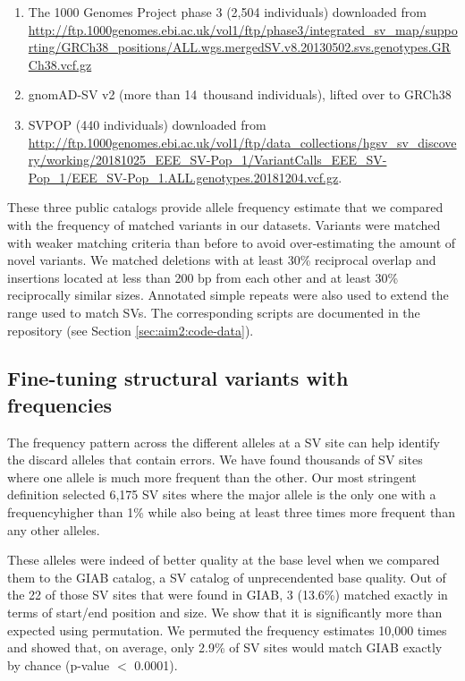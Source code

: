 \documentclass[11pt]{ucscthesis}
\begin{document}
\begin{enumerate}
\item The 1000 Genomes Project phase 3\cite{1000gp_sv_2015} (2,504 individuals) downloaded from \url{http://ftp.1000genomes.ebi.ac.uk/vol1/ftp/phase3/integrated_sv_map/supporting/GRCh38_positions/ALL.wgs.mergedSV.v8.20130502.svs.genotypes.GRCh38.vcf.gz}
\item gnomAD-SV\cite{gnomadsv_2020} v2 (more than 14~thousand individuals), lifted over to GRCh38
\item SVPOP\cite{audano_hgsvc} (440 individuals) downloaded from \url{http://ftp.1000genomes.ebi.ac.uk/vol1/ftp/data_collections/hgsv_sv_discovery/working/20181025_EEE_SV-Pop_1/VariantCalls_EEE_SV-Pop_1/EEE_SV-Pop_1.ALL.genotypes.20181204.vcf.gz}.
\end{enumerate}


These three public catalogs provide allele frequency estimate that we compared with the frequency of matched variants in our datasets.
Variants were matched with weaker matching criteria than before to avoid over-estimating the amount of novel variants.
We matched deletions with at least 30\% reciprocal overlap and insertions located at less than 200 bp from each other and at least 30\% reciprocally similar sizes.
Annotated simple repeats were also used to extend the range used to match SVs.
The corresponding scripts are documented in the repository (see Section \ref{sec:aim2:code-data}).

\subsection{Fine-tuning structural variants with frequencies}
\label{subsec:aim2:svfinetuning}


The frequency pattern across the different alleles at a SV site can help identify the discard alleles that contain errors.
We have found thousands of SV sites where one allele is much more frequent than the other.
Our most stringent definition selected 6,175 SV sites where the major allele is the only one with a frequencyhigher than 1\% while also being at least three times more frequent than any other alleles.

These alleles were indeed of better quality at the base level when we compared them to the GIAB catalog\cite{zook_robust_2020}, a SV catalog of unprecendented base quality.
Out of the 22 of those SV sites that were found in GIAB, 3 (13.6\%) matched exactly in terms of start/end position and size.
We show that it is significantly more than expected using permutation.
We permuted the frequency estimates 10,000 times and showed that, on average, only 2.9\% of SV sites would match GIAB exactly by chance (p-value $<$ 0.0001).
\end{document}
